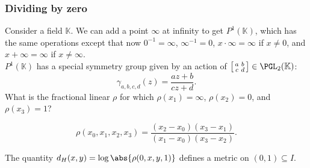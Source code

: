 \documentclass[shortlabels, 9pt, aspectratio=2013]{beamer}
\begin{document}
\begin{frame}
  \frametitle{Dividing by zero}
  Consider a field \(\mathbb{K}\). We can add a point \(\infty\) at infinity to get \(P^1(\mathbb{K})\), which has the same operations except that now \(0^{-1} = \infty\), \(\infty ^{-1} = 0\), \(x \cdot \infty = \infty\) if \(x \neq 0\), and \(x + \infty = \infty\) if \(x \neq \infty\).\\[1em]

  \(P^1(\mathbb{K})\) has a special symmetry group given by an action of \(\begin{bsmallmatrix}a&b\\c&d\end{bsmallmatrix} \in \PGL_2(\mathbb{K})\):
  \begin{equation*}
    \gamma_{a,b,c,d}(z) = \frac{az + b}{cz + d}.
  \end{equation*}
  What is the fractional linear \(\rho\) for which \(\rho(x_1) = \infty\), \(\rho(x_2) = 0\), and \(\rho(x_3) = 1\)?
  \begin{definition}
    \begin{equation*}
      \rho(x_0,x_1,x_2,x_3) = \frac{(x_2 - x_0)(x_3 - x_1)}{(x_1 - x_0)(x_3 - x_2)}.
    \end{equation*}
  \end{definition}
  \begin{definition}
    The quantity \(d_H(x,y) = \log{\abs{\rho(0,x,y,1)}}\) defines a metric on \((0,1) \subseteq I\).
  \end{definition}
\end{frame}
\end{document}
